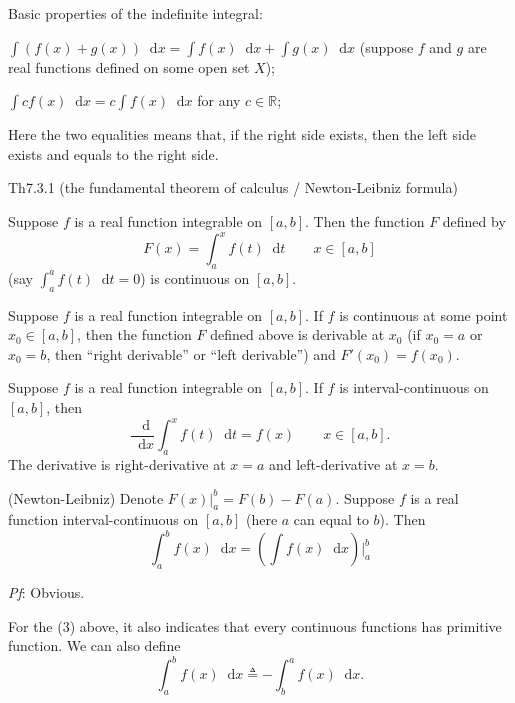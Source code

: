 \documentclass{article}
\newcommand{\dif}{\mathop{}\!\mathrm{d}}
\begin{document}
\begin{Rmk}{}
    \textcolor{Th}{Basic properties of the indefinite integral:
    \begin{compactenum}
        \item $\int \left(f(x) + g(x)\right) \dif x = \int f(x)\dif x + \int g(x)\dif x$ (suppose $f$ and $g$ are real functions defined on some open set $X$);
        \item $\int c f(x)\dif x = c\int f(x)\dif x$ for any $c\in\mathbb{R}$;
    \end{compactenum}
    Here the two equalities means that, if the right side exists, then the left side exists and equals to the right side.}
\end{Rmk}

\begin{Th}{Th7.3.1 (the fundamental theorem of calculus / Newton-Leibniz formula)}
    \begin{compactenum}
        \item Suppose $f$ is a real function integrable on $[a, b]$. Then the function $F$ defined by
            $$F(x) = \int_a^x f(t)\dif t \qquad x\in [a,b]$$
        (\textcolor{Df}{say $\int_a^a f(t)\dif t = 0$}) is continuous on $[a, b]$.
        \item Suppose $f$ is a real function integrable on $[a, b]$. If $f$ is continuous at some point $x_0\in[a, b]$, then the function $F$ defined above is derivable at $x_0$ (if $x_0 = a$ or $x_0 = b$, then ``right derivable'' or ``left derivable'') and $F'(x_0) = f(x_0)$.
        \item Suppose $f$ is a real function integrable on $[a, b]$. If $f$ is interval-continuous on $[a, b]$, then 
            $$\frac{\dif}{\dif x}\int_a^x f(t)\dif t = f(x) \qquad x\in [a, b].$$
        The derivative is right-derivative at $x=a$ and left-derivative at $x=b$.
        \item (Newton-Leibniz) \textcolor{Df}{Denote $F(x)\Big|_a^b = F(b)-F(a)$.} Suppose $f$ is a real function interval-continuous on $[a, b]$ (here $a$ can equal to $b$). Then
            $$\int_a^b f(x)\dif x = \left(\int f(x)\dif x\right)\Bigg|_a^b $$
    \end{compactenum}
    \tcblower
    \textit{Pf}: Obvious.
\end{Th}

\begin{Rmk}{}
    For the (3) above, it also indicates that \textcolor{Th}{every continuous functions has primitive function}. \textcolor{Df}{We can also define
    $$\int_a^b f(x)\dif x \triangleq -\int_b^a f(x)\dif x. $$}
\end{Rmk}
\end{document}
